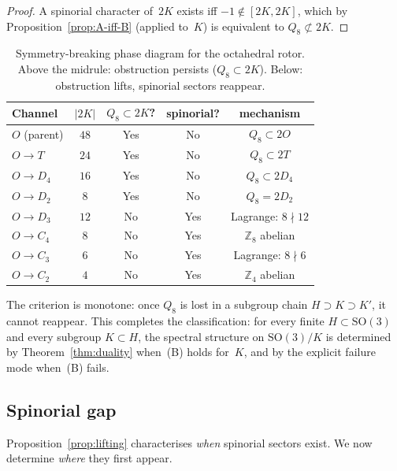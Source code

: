 \documentclass[12pt]{article}
\theoremstyle{definition}
\theoremstyle{remark}
\newcommand{\ZZ}{\mathbb{Z}}
\newcommand{\SO}{\mathrm{SO}}
\begin{document}
\begin{proof}
  A spinorial character of~$2K$ exists iff
  $-1 \notin [2K, 2K]$, which by
  Proposition~\ref{prop:A-iff-B} (applied to~$K$)
  is equivalent to $Q_8 \not\subset 2K$.
\end{proof}

\begin{table}[ht]
\centering
\begin{tabular}{@{}lcccc@{}}
  \toprule
  Channel & $|2K|$ & $Q_8 \subset 2K$?
    & spinorial? & mechanism \\
  \midrule
  $O$ (parent) & $48$ & Yes & No & $Q_8 \subset 2O$ \\
  $O \to T$    & $24$ & Yes & No & $Q_8 \subset 2T$ \\
  $O \to D_4$  & $16$ & Yes & No & $Q_8 \subset 2D_4$ \\
  $O \to D_2$  & $8$  & Yes & No & $Q_8 = 2D_2$ \\
  \midrule
  $O \to D_3$  & $12$ & No  & Yes & Lagrange: $8 \nmid 12$ \\
  $O \to C_4$  & $8$  & No  & Yes & $\ZZ_8$ abelian \\
  $O \to C_3$  & $6$  & No  & Yes & Lagrange: $8 \nmid 6$ \\
  $O \to C_2$  & $4$  & No  & Yes & $\ZZ_4$ abelian \\
  \bottomrule
\end{tabular}
\caption{Symmetry-breaking phase diagram for the octahedral
  rotor.
  Above the midrule: obstruction persists ($Q_8 \subset 2K$).
  Below: obstruction lifts, spinorial sectors reappear.}
\label{tab:lifting}
\end{table}

\noindent
The criterion is monotone: once $Q_8$ is lost in a subgroup
chain $H \supset K \supset K'$, it cannot reappear.
This completes the classification: for every finite
$H \subset \SO(3)$ and every subgroup $K \subset H$,
the spectral structure on $\SO(3)/K$ is determined
by Theorem~\ref{thm:duality} when~(B) holds for~$K$,
and by the explicit failure mode when~(B) fails.

\subsection{Spinorial gap}
\label{sec:spinorial-gap}

Proposition~\ref{prop:lifting} characterises \emph{when}
spinorial sectors exist.
We now determine \emph{where} they first appear.
\end{document}
